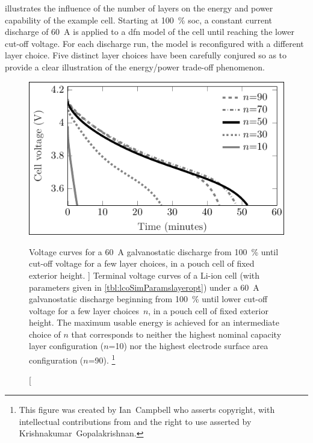  illustrates  the influence  of the  number of
layers  on the  energy and  power capability  of the  example cell.  Starting at
\SI{100}{\percent} \gls{soc},  a constant current discharge  of \SI{60}{\ampere}
is applied  to a \gls{dfn}  model of the cell  until reaching the  lower cut-off
voltage. For  each discharge  run, the  model is  reconfigured with  a different
layer choice. Five distinct layer choices  have been carefully conjured so as to
provide a clear illustration of the energy/power trade-off phenomenon.

\begin{figure}[!bp]
    \begin{minipage}[t]{\textwidth}
        \centering
        \includegraphics[trim=4 4 2 4,clip]{fig_CC_discharge_curves.pdf}
        \caption
        [%
        Voltage curves for a \SI{60}{\ampere} galvanostatic discharge from
        \SI{100}{\percent}  until cut-off voltage for a few layer
        choices, in a pouch cell of fixed exterior height.
        ]%
        {%
            Terminal voltage curves of a Li-ion cell (with parameters
            given in \cref{tbl:lcoSimParamslayeropt}) under a \SI{60}{\ampere}
            galvanostatic discharge beginning from \SI{100}{\percent}
             until lower cut-off voltage for a few layer
            choices~$n$, in a pouch cell of fixed exterior height. The maximum
            usable energy is achieved for an intermediate choice of $n$
            that corresponds to neither the highest nominal capacity layer
            configuration ($n$=\num{10}) nor the highest electrode surface area
            configuration ($n$=\num{90})\footnotemark.
        }%
        \label{fig:fig_CC_discharge_curves}
        \mpfootnotes[1]
        \footnote{This figure was created by \mbox{Ian Campbell} who asserts copyright,
            with intellectual contributions from and the right to use asserted by
        \mbox{Krishnakumar Gopalakrishnan}.}
    \end{minipage}
\end{figure}

